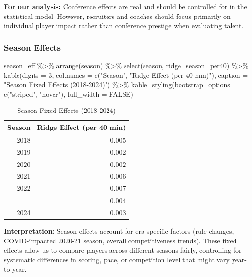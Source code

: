 \documentclass[
  letterpaper,
  DIV=11,
  numbers=noendperiod]{scrartcl}
\newenvironment{Shaded}{\begin{snugshade}}{\end{snugshade}}
\newcommand{\AttributeTok}[1]{\textcolor[rgb]{0.40,0.45,0.13}{#1}}
\newcommand{\ConstantTok}[1]{\textcolor[rgb]{0.56,0.35,0.01}{#1}}
\newcommand{\DecValTok}[1]{\textcolor[rgb]{0.68,0.00,0.00}{#1}}
\newcommand{\FunctionTok}[1]{\textcolor[rgb]{0.28,0.35,0.67}{#1}}
\newcommand{\NormalTok}[1]{\textcolor[rgb]{0.00,0.23,0.31}{#1}}
\newcommand{\SpecialCharTok}[1]{\textcolor[rgb]{0.37,0.37,0.37}{#1}}
\newcommand{\StringTok}[1]{\textcolor[rgb]{0.13,0.47,0.30}{#1}}
\begin{document}
\textbf{For our analysis:} Conference effects are real and should be
controlled for in the statistical model. However, recruiters and coaches
should focus primarily on individual player impact rather than
conference prestige when evaluating talent.

\subsubsection{Season Effects}\label{season-effects}

\begin{Shaded}
\begin{Highlighting}[]
\NormalTok{season\_eff }\SpecialCharTok{\%\textgreater{}\%}
  \FunctionTok{arrange}\NormalTok{(season) }\SpecialCharTok{\%\textgreater{}\%}
  \FunctionTok{select}\NormalTok{(season, ridge\_season\_per40) }\SpecialCharTok{\%\textgreater{}\%}
  \FunctionTok{kable}\NormalTok{(}\AttributeTok{digits =} \DecValTok{3}\NormalTok{,}
        \AttributeTok{col.names =} \FunctionTok{c}\NormalTok{(}\StringTok{"Season"}\NormalTok{, }\StringTok{"Ridge Effect (per 40 min)"}\NormalTok{),}
        \AttributeTok{caption =} \StringTok{"Season Fixed Effects (2018{-}2024)"}\NormalTok{) }\SpecialCharTok{\%\textgreater{}\%}
  \FunctionTok{kable\_styling}\NormalTok{(}\AttributeTok{bootstrap\_options =} \FunctionTok{c}\NormalTok{(}\StringTok{"striped"}\NormalTok{, }\StringTok{"hover"}\NormalTok{), }\AttributeTok{full\_width =} \ConstantTok{FALSE}\NormalTok{)}
\end{Highlighting}
\end{Shaded}

\begin{longtable}[t]{rr}
\caption{\label{tab:season-effects-table}Season Fixed Effects (2018-2024)}\\
\toprule
Season & Ridge Effect (per 40 min)\\
\midrule
2018 & 0.005\\
2019 & -0.002\\
2020 & 0.002\\
2021 & -0.006\\
2022 & -0.007\\
\addlinespace
2023 & 0.004\\
2024 & 0.003\\
\bottomrule
\end{longtable}

\textbf{Interpretation:} Season effects account for era-specific factors
(rule changes, COVID-impacted 2020-21 season, overall competitiveness
trends). These fixed effects allow us to compare players across
different seasons fairly, controlling for systematic differences in
scoring, pace, or competition level that might vary year-to-year.
\end{document}
